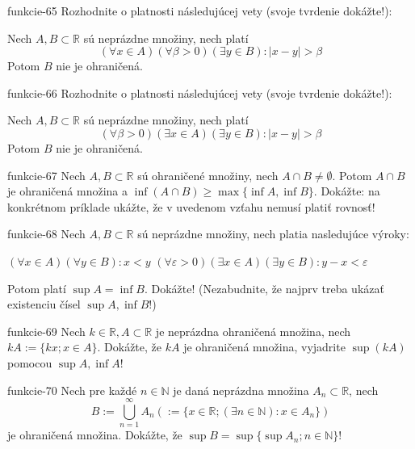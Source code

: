 \begin{defproblem}{funkcie-65}
Rozhodnite o platnosti následujúcej vety (svoje tvrdenie dokážte!):

Nech $A,B\subset\mathbb{R}$ sú neprázdne množiny, nech platí
\[
  (\forall x \in A)
    (\forall \beta >0)
      (\exists y \in B):
        |x-y|>\beta
\]
Potom $B$ nie je ohraničená.
\end{defproblem}

\begin{defproblem}{funkcie-66}
Rozhodnite o platnosti následujúcej vety (svoje tvrdenie dokážte!):

Nech $A,B \subset \mathbb{R}$ sú neprázdne množiny, nech platí
\[
  (\forall \beta > 0)
    (\exists x\in A)
      (\exists y\in B):
        |x-y|>\beta
\]
Potom $B$ nie je ohraničená.
\end{defproblem}

\begin{defproblem}{funkcie-67}
Nech $A,B\subset\mathbb{R}$ sú ohraničené množiny, nech $A\cap B\neq\emptyset$.
Potom $A\cap B$ je ohraničená množina a $\inf(A\cap B)\geq \max \{\inf A,\inf
B\}$. Dokážte: na konkrétnom príklade ukážte, že v uvedenom vzťahu nemusí platiť
rovnosť!
\end{defproblem}

\begin{defproblem}{funkcie-68}
Nech $A,B\subset\mathbb{R}$ sú neprázdne množiny, nech platia nasledujúce výroky:
\begin{tasks}
\task $(\forall x\in A) (\forall y\in B): x<y$
\task
  $
    (\forall \varepsilon>0)
      (\exists x\in A)
        (\exists y\in B):
          y - x < \varepsilon
  $
\end{tasks}
Potom platí $\sup A =\inf B$. Dokážte! (Nezabudnite, že najprv treba ukázať
existenciu čísel $\sup A,\inf B$!)
\end{defproblem}

\begin{defproblem}{funkcie-69}
Nech $k\in\mathbb{R},A\subset\mathbb{R}$ je neprázdna ohraničená množina, nech
$kA:=\{kx;x\in A\}$. Dokážte, že $kA$ je ohraničená množina, vyjadrite $\sup
(kA)$ pomocou $\sup A,\inf A$!
\end{defproblem}

\begin{defproblem}{funkcie-70}
Nech pre každé $n\in\mathbb{N}$ je daná neprázdna množina
$A_n\subset\mathbb{R}$, nech
\[
  B:=\bigcup_{n=1}^\infty A_n
    (:=\{x \in \mathbb{R};(\exists n\in\mathbb{N}):x\in A_n\})
\]
je ohraničená množina. Dokážte, že $\sup B= \sup\{\sup A_n;n\in\mathbb{N}\}$!
\end{defproblem}

